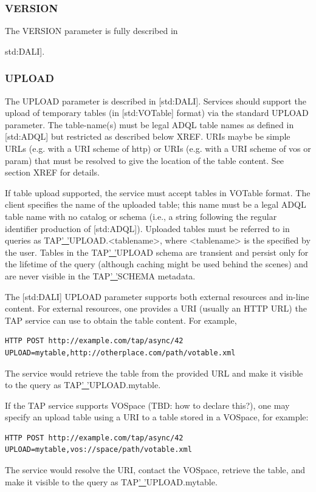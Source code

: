 \documentclass[11pt,a4paper]{ivoa}
\begin{document}
\subsubsection{VERSION}
The VERSION parameter is fully described in {std:DALI].

\subsubsection{UPLOAD}
The UPLOAD parameter is described in [std:DALI]. Services should support the 
upload of temporary tables (in [std:VOTable] format) via the standard UPLOAD 
parameter. The table-name(s) must be legal ADQL table names as defined in 
[std:ADQL] but restricted as described below XREF. URIs maybe be simple URLs 
(e.g. with a URI scheme of http) or URIs (e.g. with a URI scheme of vos or 
param) that must be resolved to give the location of the table content. See 
section XREF for details.

If table upload supported, the service must accept tables in VOTable format. 
The client specifies the name of the uploaded table; this name must be a legal 
ADQL table name with no catalog or schema (i.e., a string following the 
regular identifier production of [std:ADQL]). Uploaded tables must be referred 
to in queries as TAP\underline{' '}UPLOAD.<tablename>, where <tablename> is the 
specified by the user. Tables in the TAP\underline{' '}UPLOAD schema are 
transient and persist only for the lifetime of the query (although caching might 
be used behind the scenes) and are never visible in the 
TAP\underline{' '}SCHEMA metadata.

The [std:DALI] UPLOAD parameter supports both external resources and in-line 
content. For external resources, one provides a URI (usually an HTTP URL) the 
TAP service can use to obtain the table content. For example,
\begin{verbatim}
HTTP POST http://example.com/tap/async/42
UPLOAD=mytable,http://otherplace.com/path/votable.xml
\end{verbatim}
The service would retrieve the table from the provided URL and 
make it visible to the query as TAP\underline{' '}UPLOAD.mytable.

If the TAP service supports VOSpace (TBD: how to declare this?), one may 
specify an upload table using a URI to a table stored in a VOSpace, for example:
\begin{verbatim}
HTTP POST http://example.com/tap/async/42
UPLOAD=mytable,vos://space/path/votable.xml
\end{verbatim}
The service would resolve the URI, contact the VOSpace, retrieve the table, and 
make it visible to the query as TAP\underline{' '}UPLOAD.mytable.

}
\end{document}
